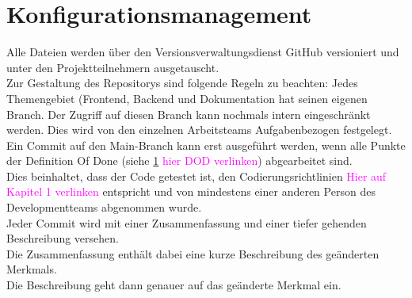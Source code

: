 
\chapter{Konfigurationsmanagement}
Alle Dateien werden über den Versionsverwaltungsdienst GitHub versioniert und unter den Projektteilnehmern ausgetauscht.\\
Zur Gestaltung des Repositorys sind folgende Regeln zu beachten:
Jedes Themengebiet (Frontend, Backend und Dokumentation hat seinen eigenen Branch.
Der Zugriff auf diesen Branch kann nochmals intern eingeschränkt werden. Dies wird von den einzelnen Arbeitsteams Aufgabenbezogen festgelegt. \\
Ein Commit auf den Main-Branch kann erst ausgeführt werden, wenn alle Punkte der Definition Of Done (siehe \ref{} \textcolor{magenta}{hier DOD verlinken}) abgearbeitet sind. \\
Dies beinhaltet, dass der Code getestet ist, den Codierungsrichtlinien \textcolor{magenta}{Hier auf Kapitel 1 verlinken} entspricht und von mindestens einer anderen Person des Developmentteams abgenommen wurde. \\

Jeder Commit wird mit einer Zusammenfassung und einer tiefer gehenden Beschreibung versehen. \\
Die Zusammenfassung enthält dabei eine kurze Beschreibung des geänderten Merkmals. \\
Die Beschreibung geht dann genauer auf das geänderte Merkmal ein. \\

